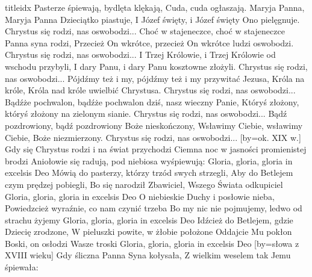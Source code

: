 \documentclass[a5paper, portrait, 12pt]{mwart}
\begin{document}
\begin{songs}{titleidx}
    Pasterze śpiewają, bydlęta klękają,
    Cuda, cuda ogłaszają.
\endchorus
\beginverse
    Maryja Panna, Maryja Panna Dzieciątko piastuje,
    I Józef święty, i Józef święty Ono pielęgnuje.
\endverse
\beginchorus
    Chrystus się rodzi, nas oswobodzi...
\endchorus
\beginverse
    Choć w stajeneczce, choć w stajeneczce Panna syna rodzi,
    Przecież On wkrótce, przecież On wkrótce ludzi oswobodzi.
\endverse
\beginchorus
    Chrystus się rodzi, nas oswobodzi...
\endchorus
\beginverse
    I Trzej Królowie, i Trzej Królowie od wschodu przybyli,
    I dary Panu, i dary Panu kosztowne złożyli.
\endverse
\beginchorus
    Chrystus się rodzi, nas oswobodzi...
\endchorus
\beginverse
    Pójdźmy też i my, pójdźmy też i my przywitać Jezusa,
    Króla na króle, Króla nad króle uwielbić Chrystusa.
\endverse
\beginchorus
    Chrystus się rodzi, nas oswobodzi...
\endchorus
\beginverse
    Bądźże pochwalon, bądźże pochwalon dziś, nasz wieczny Panie,
    Któryś złożony, któryś złożony na zielonym sianie.
\endverse
\beginchorus
    Chrystus się rodzi, nas oswobodzi...
\endchorus
\beginverse
    Bądź pozdrowiony, bądź pozdrowiony Boże nieskończony,
    Wsławimy Ciebie, wsławimy Ciebie, Boże niezmierzony.
\endverse
\beginchorus
    Chrystus się rodzi, nas oswobodzi...
\endchorus
\endsong
[by={ok. XIX w.}]
\beginverse
    Gdy się Chrystus rodzi i na świat przychodzi
    Ciemna noc w jasności promienistej brodzi
    Aniołowie się radują, pod niebiosa wyśpiewują:
\endverse
\beginchorus
        Gloria, gloria, gloria in excelsis Deo
\endchorus
\beginverse
    Mówią do pasterzy, którzy trzód swych strzegli,
    Aby do Betlejem czym prędzej pobiegli,
    Bo się narodził Zbawiciel, Wszego Świata odkupiciel
\endverse
\beginchorus
        Gloria, gloria, gloria in excelsis Deo
\endchorus
\beginverse
    O niebieskie Duchy i posłowie nieba,
    Powiedzcież wyraźnie, co nam czynić trzeba
    Bo my nic nie pojmujemy, ledwo od strachu żyjemy
\endverse
\beginchorus
        Gloria, gloria, gloria in excelsis Deo
\endchorus
\beginverse
    Idźcież do Betlejem, gdzie Dziecię zrodzone,
    W pieluszki powite, w żłobie położone
    Oddajcie Mu pokłon Boski, on osłodzi Wasze troski
\endverse
\beginchorus
        Gloria, gloria, gloria in excelsis Deo
\endchorus
\endsong
[by={słowa z XVIII wieku}]
\beginverse
    Gdy śliczna Panna Syna kołysała,
    Z wielkim weselem tak Jemu śpiewała:


\end{songs}
\end{document}
